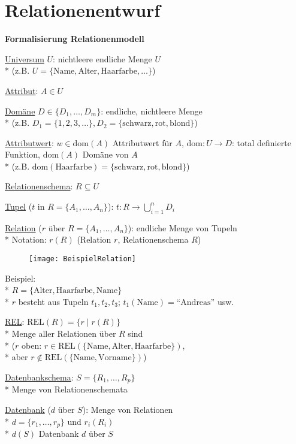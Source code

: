 \section{Relationenentwurf}
\label{sec:relationenentwurf}

\textbf{Formalisierung Relationenmodell}
\begin{items}
	\item \underline{Universum} \( U \): nichtleere endliche Menge \( U \)\\* (z.B. \( U= \{ \text{Name}, \text{Alter}, \text{Haarfarbe}, \dots \} \))
	\item \underline{Attribut}: \( A \in U \)
	\item \underline{Domäne} \( D \in \{ D_1, \dots, D_m \} \): endliche, nichtleere Menge \\* (z.B. \( D_1 = \{ 1,2,3,\dots \}, D_2 = \{ \text{schwarz}, \text{rot}, \text{blond} \} \))
	\item \underline{Attributwert}: \( w \in \text{dom}(A) \) Attributwert für \( A \), \( \text{dom}: U \to D \): total definierte Funktion, \( \text{dom}(A) \) Domäne von \( A \) \\* (z.B. \( \text{dom}(\text{Haarfarbe}) = \{ \text{schwarz}, \text{rot}, \text{blond} \} \))
	\item \underline{Relationenschema}: \( R \subseteq U \)
	\item \underline{Tupel} (\( t \) in \( R = \{ A_1, \dots, A_n \} \)): \( t: R \to \bigcup_{i=1}^n D_i \)
	\item \underline{Relation} (\( r \) über \( R = \{ A_1, \dots, A_n \} \)): endliche Menge von Tupeln \\* Notation: \( r(R) \) (Relation \( r \), Relationenschema \( R \))
	\begin{figure}[H]\centering\label{BeispielRelation}\texttt{[image: BeispielRelation]}\end{figure}
	\item Beispiel: \\* \( R = \{ \text{Alter}, \text{Haarfarbe}, \text{Name} \} \) \\* \( r \) besteht aus Tupeln \( t_1, t_2, t_3 \); \( t_1(\text{Name}) = \text{``Andreas''} \) usw.
	\item \underline{REL}: \( \text{REL}(R) = \{ r \mid r(R) \} \) \\* Menge aller Relationen über \( R \) sind \\* (\( r \) oben: \( r \in \text{REL}(\{ \text{Name}, \text{Alter}, \text{Haarfarbe} \}) \), \\* aber \( r \not \in \text{REL}(\{ \text{Name}, \text{Vorname} \}) \))
	\item \underline{Datenbankschema}: \( S = \{ R_1, \dots, R_p \} \) \\* Menge von Relationenschemata
	\item \underline{Datenbank} (\( d \) über \( S \)): Menge von Relationen \\* \( d = \{ r_1, \dots, r_p \} \) und \( r_i(R_i) \) \\* \( d(S) \) Datenbank \( d \) über \( S \)
\end{items}

